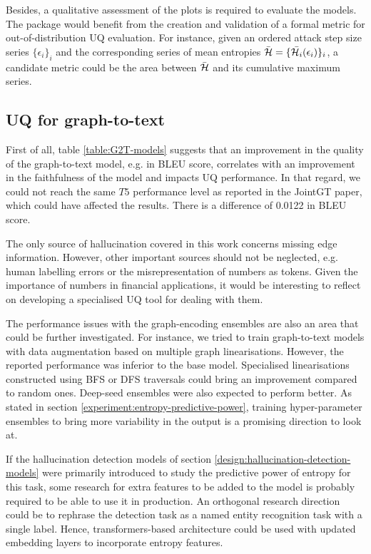 Besides, a qualitative assessment of the plots is required to evaluate the models. The package would benefit from the creation and validation of a formal metric for out-of-distribution UQ evaluation. For instance, given an ordered attack step size series $\{\epsilon_i\}_i$ and the corresponding series of mean entropies $\Bar{\operatorname{\mathcal{H}}} = \{\Bar{\operatorname{\mathcal{H}}_i}(\epsilon_i)\}_i$, a candidate metric could be the area between $\Bar{\operatorname{\mathcal{H}}}$ and its cumulative maximum series.

\subsection{UQ for graph-to-text}

First of all, table \ref{table:G2T-models} suggests that an improvement in the quality of the graph-to-text model, e.g. in BLEU score, correlates with an improvement in the faithfulness of the model and impacts UQ performance. In that regard, we could not reach the same $T5$ performance level as reported in the JointGT\cite{JointGT} paper, which could have affected the results. There is a difference of 0.0122 in BLEU score.

The only source of hallucination covered in this work concerns missing edge information. However, other important sources should not be neglected, e.g. human labelling errors or the misrepresentation of numbers as tokens\cite{surveyHallucination, representingNumbersNLP}. Given the importance of numbers in financial applications, it would be interesting to reflect on developing a specialised UQ tool for dealing with them.

The performance issues with the graph-encoding ensembles are also an area that could be further investigated. For instance, we tried to train graph-to-text models with data augmentation based on multiple graph linearisations. However, the reported performance was inferior to the base model. Specialised linearisations constructed using BFS or DFS traversals could bring an improvement compared to random ones. Deep-seed ensembles were also expected to perform better. As stated in section \ref{experiment:entropy-predictive-power}, training hyper-parameter ensembles to bring more variability in the output is a promising direction to look at.

If the hallucination detection models of section \ref{design:hallucination-detection-models} were primarily introduced to study the predictive power of entropy for this task, some research for extra features to be added to the model is probably required to be able to use it in production. An orthogonal research direction could be to rephrase the detection task as a named entity recognition task with a single label. Hence, transformers-based architecture could be used with updated embedding layers to incorporate entropy features.

